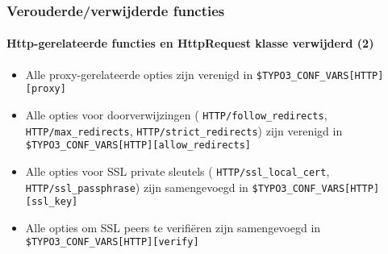 \begin{frame}[fragile]
	\frametitle{Verouderde/verwijderde functies}
	\framesubtitle{Http-gerelateerde functies en HttpRequest klasse verwijderd (2)}

	\begin{itemize}

		\item Alle proxy-gerelateerde opties zijn verenigd in\newline
			\small\texttt{\$TYPO3\_CONF\_VARS[HTTP][proxy]}\normalsize

		\item Alle opties voor doorverwijzingen
			(\small
				\texttt{HTTP/follow\_redirects},
				\texttt{HTTP/max\_redirects},
				\texttt{HTTP/strict\_redirects}\normalsize)
			zijn verenigd in
			\small
				\texttt{\$TYPO3\_CONF\_VARS[HTTP][allow\_redirects]}
			\normalsize

		\item Alle opties voor SSL private sleutels
			(\small
				\texttt{HTTP/ssl\_local\_cert},
				\texttt{HTTP/ssl\_passphrase}\normalsize)
			zijn samengevoegd in
			\small
				\texttt{\$TYPO3\_CONF\_VARS[HTTP][ssl\_key]}
			\normalsize

		\item Alle opties om SSL peers te verifiëren zijn samengevoegd in
			\small
				\texttt{\$TYPO3\_CONF\_VARS[HTTP][verify]}
			\normalsize

	\end{itemize}

\end{frame}


